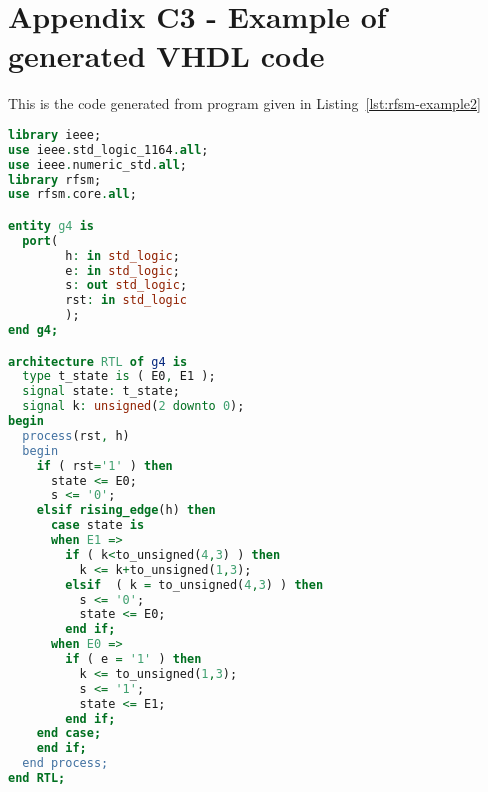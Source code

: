 \chapter*{Appendix C3 - Example of generated VHDL code}  
\label{cha:ex2-vhdl}

This is the code generated from program given in Listing~\ref{lst:rfsm-example2} 

\begin{lstlisting}[language=VHDL,frame=single,numbers=none,basicstyle=\small,caption=File g4.vhd]
library ieee;
use ieee.std_logic_1164.all;
use ieee.numeric_std.all;
library rfsm;
use rfsm.core.all;

entity g4 is
  port(
        h: in std_logic;
        e: in std_logic;
        s: out std_logic;
        rst: in std_logic
        );
end g4;

architecture RTL of g4 is
  type t_state is ( E0, E1 );
  signal state: t_state;
  signal k: unsigned(2 downto 0);
begin
  process(rst, h)
  begin
    if ( rst='1' ) then
      state <= E0;
      s <= '0';
    elsif rising_edge(h) then 
      case state is
      when E1 =>
        if ( k<to_unsigned(4,3) ) then
          k <= k+to_unsigned(1,3);
        elsif  ( k = to_unsigned(4,3) ) then
          s <= '0';
          state <= E0;
        end if;
      when E0 =>
        if ( e = '1' ) then
          k <= to_unsigned(1,3);
          s <= '1';
          state <= E1;
        end if;
    end case;
    end if;
  end process;
end RTL;
\end{lstlisting}

